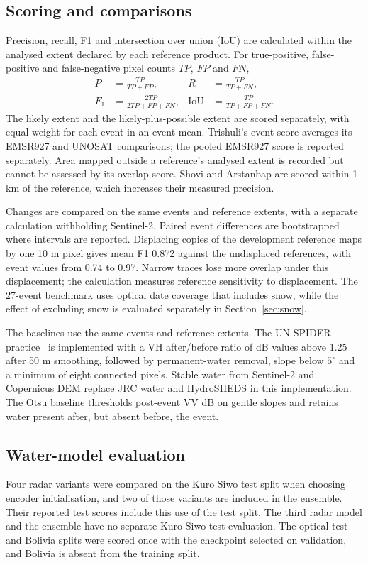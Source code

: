 \documentclass[10pt,twocolumn,letterpaper]{article}
\begin{document}
\subsection{Scoring and comparisons}
Precision, recall, F1 and intersection over union (IoU) are calculated within the analysed extent
declared by each reference product. For true-positive, false-positive and false-negative pixel
counts $TP$, $FP$ and $FN$,
\begin{equation}
\begin{aligned}
P&=\frac{TP}{TP+FP}, & R&=\frac{TP}{TP+FN},\\[4pt]
F_1&=\frac{2TP}{2TP+FP+FN}, &
\mathrm{IoU}&=\frac{TP}{TP+FP+FN}.
\end{aligned}
\label{eq:metrics}
\end{equation}
The likely extent and the likely-plus-possible extent are scored separately, with equal weight for
each event in an event mean. Trishuli's event score averages its EMSR927 and UNOSAT comparisons; the
pooled EMSR927 score is reported separately. Area mapped outside a reference's analysed extent is
recorded but cannot be assessed by its overlap score. Shovi and Arstanbap are scored within 1 km of
the reference, which increases their measured precision.

Changes are compared on the same events and reference extents, with a separate calculation
withholding Sentinel-2. Paired event differences are bootstrapped where intervals are reported.
Displacing copies of the development reference maps by one 10 m pixel gives mean F1 0.872 against
the undisplaced references, with event values from 0.74 to 0.97. Narrow traces lose more overlap
under this displacement; the calculation measures reference sensitivity to displacement. The
27-event benchmark uses optical date coverage that includes snow, while the effect of excluding snow
is evaluated separately in Section~\ref{sec:snow}.

The baselines use the same events and reference extents. The UN-SPIDER practice~\cite{unspider} is
implemented with a VH after/before ratio of dB values above 1.25 after 50 m smoothing, followed by
permanent-water removal, slope below $5^\circ$ and a minimum of eight connected pixels. Stable water
from Sentinel-2 and Copernicus DEM replace JRC water and HydroSHEDS in this implementation. The Otsu
baseline thresholds post-event VV dB on gentle slopes and retains water present after, but absent
before, the event.

\subsection{Water-model evaluation}
\label{sec:model-evaluation}
Four radar variants were compared on the Kuro Siwo test split when choosing encoder initialisation,
and two of those variants are included in the ensemble. Their reported test scores include this use
of the test split. The third radar model and the ensemble have no separate Kuro Siwo test
evaluation. The optical test and Bolivia splits were scored once with the checkpoint selected on
validation, and Bolivia is absent from the training split.
\end{document}
